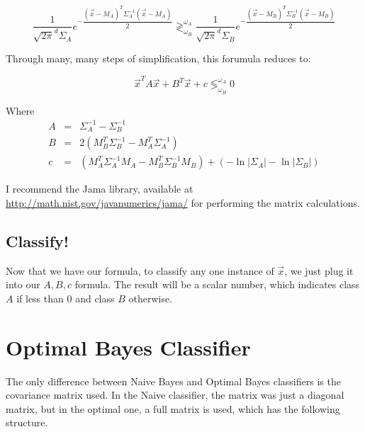 \documentclass{article}
\begin{document}
\begin{displaymath}
 \dfrac{1}{\sqrt{2\pi}^d \Sigma_A} e^{-\dfrac{(\vec{x}-M_A)^T \Sigma^{-1}_A (\vec{x}-M_A)}{2}}
  \gtrless^{\omega_A}_{\omega_B} 
  \dfrac{1}{\sqrt{2\pi}^d \Sigma_B} e^{-\dfrac{(\vec{x}-M_B)^T \Sigma^{-1}_B (\vec{x}-M_B)}{2}}
\end{displaymath}


Through many, many steps of simplification, this forumula reduces to:

\begin{displaymath}
\vec{x}^{T}A\vec{x} + B^{T}\vec{x} + c  \lessgtr^{\omega_A}_{\omega_B} 0
\end{displaymath}

Where
\begin{eqnarray*}
  A & = & \Sigma^{-1}_A - \Sigma^{-1}_B \\
  B & = & 2(M^{T}_{B}\Sigma^{-1}_B - M^{T}_{A}\Sigma^{-1}_A)\\
  c & = & (M^{T}_{A}\Sigma^{-1}_{A}M_A - M^{T}_{B}\Sigma^{-1}_{B}M_B) + (-\ln{|\Sigma_A|} - \ln{|\Sigma_B|})
\end{eqnarray*}

I recommend the Jama library, available at
\href{http://math.nist.gov/javanumerics/jama/}{http://math.nist.gov/javanumerics/jama/}
for performing the matrix calculations.

\subsection{Classify!}

Now that we have our formula, to classify any one instance of
$\vec{x}$, we just plug it into our $A, B, c$ formula.  The result
will be a scalar number, which indicates class $A$ if less than $0$
and class $B$ otherwise.



\section{Optimal Bayes Classifier}
\label{sec:obayes}

The only difference between Naive Bayes and Optimal Bayes classifiers
is the covariance matrix used.  In the Naive classifier, the matrix
was just a diagonal matrix, but in the optimal one, a full matrix is
used, which has the following structure.
\end{document}
